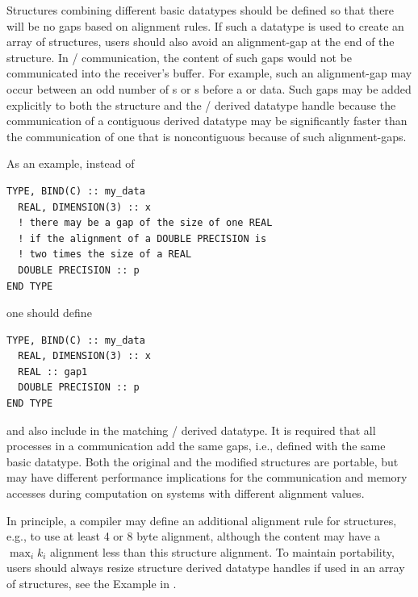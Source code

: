 \begin{users}
Structures combining different basic datatypes should be defined so that there will
be no gaps based on alignment rules.  If such a datatype is used to create an array of structures, users
should also avoid an alignment-gap at the end of the structure.
In \MPI/ communication, the content of such gaps would not be communicated
into the receiver's buffer.
For example, such an alignment-gap may occur between an odd number of
s or s before a  or
 data.  Such gaps
may be added explicitly to both the structure and the \MPI/ derived
datatype handle because the communication of a contiguous derived
datatype may be significantly faster than the communication of one
that is noncontiguous because of such alignment-gaps.

As an example, instead of

\begin{lstlisting}[language={[MPI08]Fortran}]
TYPE, BIND(C) :: my_data
  REAL, DIMENSION(3) :: x
  ! there may be a gap of the size of one REAL
  ! if the alignment of a DOUBLE PRECISION is
  ! two times the size of a REAL
  DOUBLE PRECISION :: p
END TYPE
\end{lstlisting}

one should define

\begin{lstlisting}[language={[MPI08]Fortran}]
TYPE, BIND(C) :: my_data
  REAL, DIMENSION(3) :: x
  REAL :: gap1
  DOUBLE PRECISION :: p
END TYPE
\end{lstlisting}

and also include  in the matching \MPI/ derived datatype.
It is required that all processes in a communication add the same
gaps, i.e., defined with the same basic datatype.
Both the original and the modified structures are portable,
but may have different performance implications for the
communication and memory accesses during computation on
systems with different alignment values.

In principle, a compiler may define an additional alignment rule
for structures, e.g., to use at least 4 or 8 byte alignment, although
the content may have a $\max_i k_i$ alignment less than this structure
alignment. To maintain portability, users should
always resize structure derived datatype handles
if used in an array of structures, see the Example in
.
\end{users}

